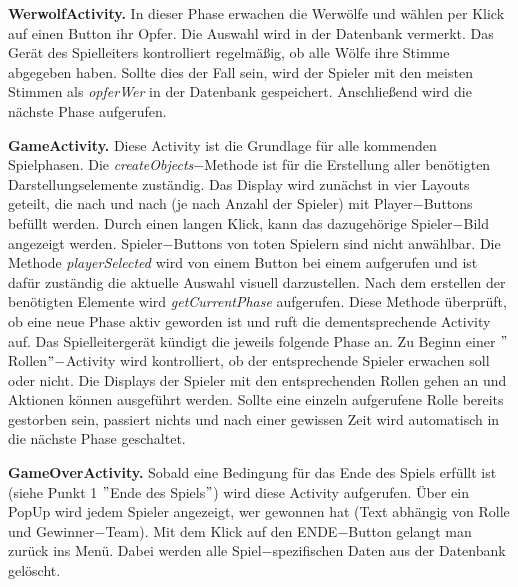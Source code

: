 \documentclass[12pt, a4paper]{article}
\begin{document}
\textbf{WerwolfActivity.}
In dieser Phase erwachen die Werwölfe und wählen per Klick auf einen Button ihr Opfer.
Die Auswahl wird in der Datenbank vermerkt. Das Gerät des Spielleiters kontrolliert regelmäßig,
ob alle Wölfe ihre Stimme abgegeben haben. Sollte dies der Fall sein, wird der Spieler mit den meisten
Stimmen als \textit{opferWer} in der Datenbank gespeichert.
Anschließend wird die nächste Phase aufgerufen.

\vspace{0,3 cm}

\textbf{GameActivity.}
Diese Activity ist die Grundlage für alle kommenden Spielphasen. Die \textit{createObjects}$-$Methode ist für die Erstellung aller benötigten Darstellungselemente zuständig. Das Display wird zunächst in vier Layouts geteilt, die nach und nach (je nach Anzahl der Spieler) mit Player$-$Buttons befüllt werden. Durch einen langen Klick, kann das dazugehörige Spieler$-$Bild angezeigt werden. Spieler$-$Buttons von toten Spielern sind nicht anwählbar.
Die Methode \textit{playerSelected} wird von einem Button bei einem aufgerufen und ist dafür zuständig die aktuelle Auswahl visuell darzustellen.
Nach dem erstellen der benötigten Elemente wird \textit{getCurrentPhase} aufgerufen. Diese Methode überprüft, ob eine neue Phase aktiv geworden ist und ruft die dementsprechende Activity auf. Das Spielleitergerät kündigt die jeweils folgende Phase an.
Zu Beginn einer $"$Rollen$"-$Activity wird kontrolliert, ob der entsprechende Spieler erwachen soll oder nicht. Die Displays der Spieler mit den entsprechenden Rollen gehen an und Aktionen können ausgeführt werden.
Sollte eine einzeln aufgerufene Rolle bereits gestorben sein, passiert nichts und nach einer
gewissen Zeit wird automatisch in die nächste Phase geschaltet.

\vspace{0,3 cm}
            
\textbf{GameOverActivity.}
Sobald eine Bedingung für das Ende des Spiels erfüllt ist (siehe Punkt 1 $"$Ende des Spiels$"$) wird diese Activity aufgerufen.
Über ein PopUp wird jedem Spieler angezeigt, wer gewonnen hat (Text abhängig von Rolle und Gewinner$-$Team).
Mit dem Klick auf den ENDE$-$Button gelangt man zurück ins Menü. Dabei werden alle Spiel$-$spezifischen Daten aus der Datenbank gelöscht.

\vspace{0,3 cm}
      
\end{document}
